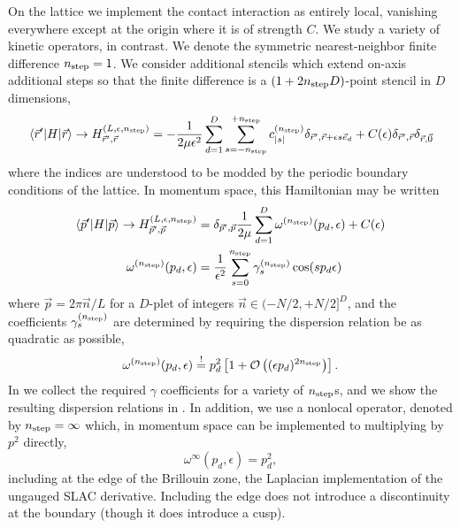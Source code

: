 On the lattice we implement the contact interaction as entirely local, vanishing everywhere except at the origin where it is of strength $C$.  We study a variety of kinetic operators, in contrast.  We denote the symmetric nearest-neighbor finite difference ${n_\text{step}}=1$.  We consider additional stencils which extend on-axis additional steps so that the finite difference is a $(1+2{n_\text{step}} D)$-point stencil in $D$ dimensions,
\begin{equation}
    \left\langle \vec{r}' \middle| H \middle| \vec{r} \right\rangle
    \rightarrow
    H_{\vec{r}',\vec{r}}^{(L,\epsilon,{n_\text{step}})}
    = - \frac{1}{2 \mu \epsilon^2} \sum_{d=1}^{D} \sum_{s=-{n_\text{step}}}^{+{n_\text{step}}} c^{({n_\text{step}})}_{|s|} \delta_{\vec{r}',\vec{r}+\epsilon s \vec{e}_d} + C(\epsilon) \delta_{\vec{r}',\vec{r}}\delta_{\vec{r},\vec{0}}
\end{equation}
where the indices are understood to be modded by the periodic boundary conditions of the lattice.
In momentum space, this Hamiltonian may be written
\begin{align}
    \left\langle \vec{p}' \middle| H \middle| \vec{p} \right\rangle
    \rightarrow
    H_{\vec{p}',\vec{p}}^{(L,\epsilon,{n_\text{step}})}
    &= \delta_{\vec{p}',\vec{p}} \frac{1}{2\mu} \sum_{d=1}^{D} \omega^{({n_\text{step}})}(p_d,\epsilon) + C(\epsilon)
    \\
    \label{eq:gamma definition}
    \omega^{({n_\text{step}})}(p_d,\epsilon)
    &= \frac{1}{\epsilon^2} \sum_{s=0}^{{n_\text{step}}} \gamma_{s}^{({n_\text{step}})} \cos(s p_d \epsilon)
\end{align}
where $\vec{p} = 2\pi \vec{n}/L$ for a $D$-plet of integers $\vec{n} \in (-N/2, +N/2]^D$, and the coefficients $\gamma_{s}^{({n_\text{step}})}$ are determined by requiring the dispersion relation be as quadratic as possible,
\begin{equation}
    \label{eq:gamma determination}
    \omega^{({n_\text{step}})}(p_d,\epsilon) \overset{!}{=} p_d^2 \left[ 1 + \mathcal{O}\left((\epsilon p_d)^{2{n_\text{step}}}\right)\right].
\end{equation}
In  we collect the required $\gamma$ coefficients for a variety of ${n_\text{step}}$s, and we show the resulting dispersion relations in .
In addition, we use a nonlocal operator, denoted by ${n_\text{step}}=\infty$ which, in momentum space can be implemented to multiplying by $p^2$ directly,
\begin{equation}
    \omega^{\infty}(p_d,\epsilon) = p_d^2,
\end{equation}
including at the edge of the Brillouin zone, the Laplacian implementation of the ungauged SLAC derivative.
Including the edge does not introduce a discontinuity at the boundary (though it does introduce a cusp).

